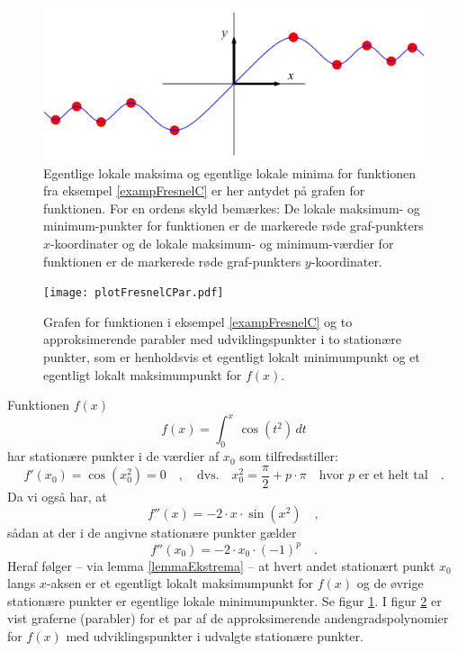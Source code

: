 \begin{figure}[ht]
\centerline{ \includegraphics[height=45mm]{plotFresnelC.pdf}}
\begin{center}
\caption{Egentlige lokale maksima og egentlige lokale minima for funktionen fra eksempel \ref{exampFresnelC} er her antydet  på grafen for funktionen. For en ordens skyld bemærkes: De lokale maksimum- og minimum-punkter for funktionen er de markerede røde graf-punkters $x$-koordinater og de lokale maksimum- og minimum-værdier for funktionen er de markerede røde graf-punkters $y$-koordinater.} \label{figFresnelC}
\end{center}
\end{figure}

\begin{figure}[ht]
\centerline{ \texttt{[image: plotFresnelCPar.pdf]}}
\begin{center}
\caption{Grafen for funktionen i eksempel \ref{exampFresnelC} og to approksimerende parabler med udviklingspunkter i to stationære punkter, som er henholdsvis et egentligt lokalt minimumpunkt og et egentligt lokalt maksimumpunkt for $f(x)$.} \label{figFresnelCPar}
\end{center}
\end{figure}

\begin{example} \label{exampFresnelC}
Funktionen $f(x)$
\begin{equation}
f(x) = \int_{0}^{x}\, \cos(t^{2}) \, dt
\end{equation}
har stationære punkter i de værdier af $x_{0}$ som tilfredsstiller:
\begin{equation}
f'(x_{0}) = \cos(x_{0}^{2}) = 0 \quad , \quad \textrm{dvs.} \quad x_{0}^{2} = \frac{\pi}{2} + p\cdot \pi \quad \textrm{hvor $p$ er et helt tal} \quad.
\end{equation}
Da vi også har, at
\begin{equation}
f''(x) = -2\cdot x \cdot \sin(x^{2}) \quad ,
\end{equation}
sådan at der i de angivne stationære punkter gælder
\begin{equation}
f''(x_{0}) = -2 \cdot x_{0} \cdot (-1)^{p} \quad .
\end{equation}
Heraf følger -- via lemma \ref{lemmaEkstrema} -- at hvert andet stationært punkt $x_{0}$ langs $x$-aksen er et egentligt lokalt maksimumpunkt for $f(x)$ og de øvrige stationære
punkter er egentlige lokale minimumpunkter. Se figur \ref{figFresnelC}. I figur \ref{figFresnelCPar} er vist graferne (parabler) for et par af de approksimerende andengradspolynomier for $f(x)$ med udviklingspunkter i udvalgte stationære punkter.
\end{example}

